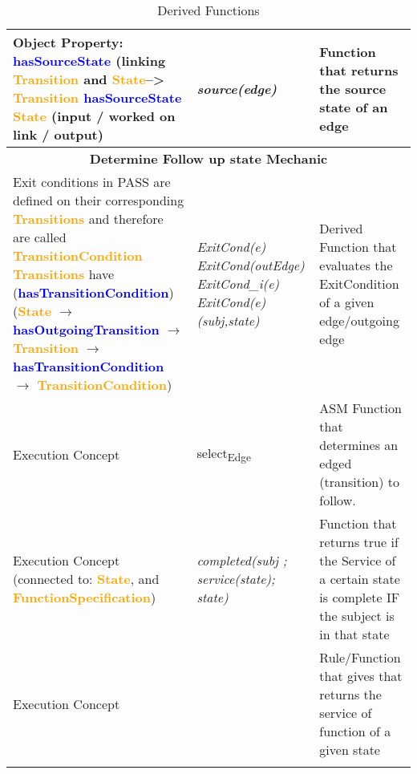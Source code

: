 \begin{landscape}
\begin {longtable} {| p{} | p{} | p{}|}
	Object Property: \textcolor{blue}{\textbf{hasSourceState}}
	(linking \textcolor{orange}{\textbf{Transition}} and \textcolor{orange}{\textbf{State}}-->
	\textcolor{orange}{\textbf{Transition}} \textcolor{blue}{\textbf{hasSourceState}} \textcolor{orange}{\textbf{State}}
	(input / worked on link  / output)
	& \textit{source(edge)}
	&  Function that returns the source state of an edge
	\\
	\hline
	\multicolumn{3}{c|}{\textbf{Determine Follow up state Mechanic}}
	\\
	\hline
	Exit conditions in PASS are defined on their corresponding
	\newline 
	\textcolor{orange}{\textbf{Transitions}} and therefore are called
	\newline
	\textcolor{orange}{\textbf{TransitionCondition}}
	\newline 
	\textcolor{orange}{\textbf{Transitions}}  have  (\textcolor{blue}{\textbf{hasTransitionCondition}})
	(\textcolor{orange}{\textbf{State}} $\rightarrow$
	\textcolor{blue}{\textbf{hasOutgoingTransition}} $\rightarrow$ \textcolor{orange}{\textbf{Transition }}  $\rightarrow$ \textcolor{blue}{\textbf{hasTransitionCondition}} $\rightarrow$ \textcolor{orange}{\textbf{TransitionCondition}})
	& \textit{ExitCond(e)}
	\newline
	\textit{ExitCond(outEdge)}
	\newline
	\textit{ExitCond\_i(e)}
	\newline
	\textit{ExitCond(e)(subj,state)}
	&  Derived Function that evaluates the ExitCondition of a given edge/outgoing edge 
	\\
	\hline
	Execution Concept 
	& select\textsubscript{Edge}
	&  ASM Function that determines an edged (transition) to follow.
	\\
	\hline
	Execution Concept (connected to: \textcolor{orange}{\textbf{State}}, and \textcolor{orange}{\textbf{FunctionSpecification}})
	& \textit{completed(subj ; \newline service(state); state)}
	&  Function that returns true if the Service of a certain state is complete IF the subject is in that state
	\\
	\hline
	Execution Concept
	& 
	&  Rule/Function that gives that returns the service of function of a given state
	\\
	\hline

	\caption{Derived Functions}
	\label{tab:Derived-Functions}
\end{longtable}
\end {landscape}

